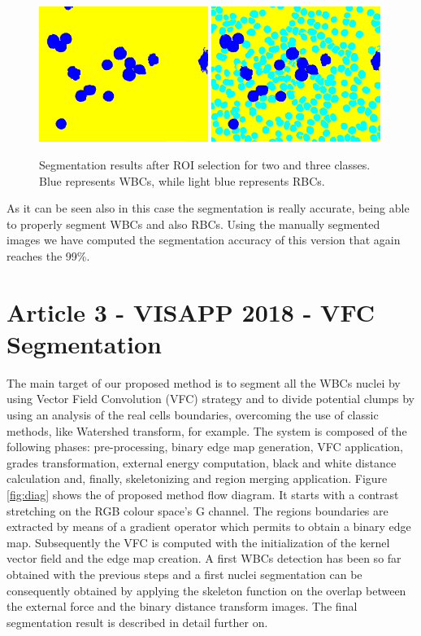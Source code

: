 \documentclass[final,a4paper,12pt,english]{UnicaPhdThesis3}
\begin{document}
\begin{figure}[!t]
	\centering
	\includegraphics[width=0.49\textwidth]{images/2015_1_caip/ROI4}
	\includegraphics[width=0.49\textwidth]{images/2015_1_caip/ROI5}
	\caption{\label{fig:ex7}Segmentation results after ROI selection for two and three classes. Blue represents WBCs, while light blue represents RBCs.}
\end{figure}

As it can be seen also in this case the segmentation is really accurate, being able to properly segment WBCs and also RBCs. Using the manually segmented images we have computed the segmentation accuracy of this version that again reaches the 99\%. 

\section{Article 3 - VISAPP 2018 - VFC Segmentation}
The main target of our proposed method is to segment all the WBCs nuclei by using Vector Field Convolution (VFC) strategy and to divide potential clumps by using an analysis of the real cells boundaries, overcoming the use of classic methods, like Watershed transform, for example. 
The system is composed of the following phases: pre-processing, binary edge map generation, VFC \cite{VFC} application, grades transformation, external energy computation, black and white distance calculation and, finally, skeletonizing and region merging application. Figure \ref{fig:diag} shows the of proposed method flow diagram. It starts with a contrast stretching on the RGB colour space's G channel. 
The regions boundaries are extracted by means of a gradient operator which permits to obtain a binary edge map. Subsequently the VFC is computed with the initialization of the kernel vector field and the edge map creation. A first WBCs detection has been so far obtained with the previous steps and a first nuclei segmentation can be consequently obtained by applying the skeleton function on the overlap between the external force and the binary distance transform images. The final segmentation result is described in detail further on.
\end{document}

